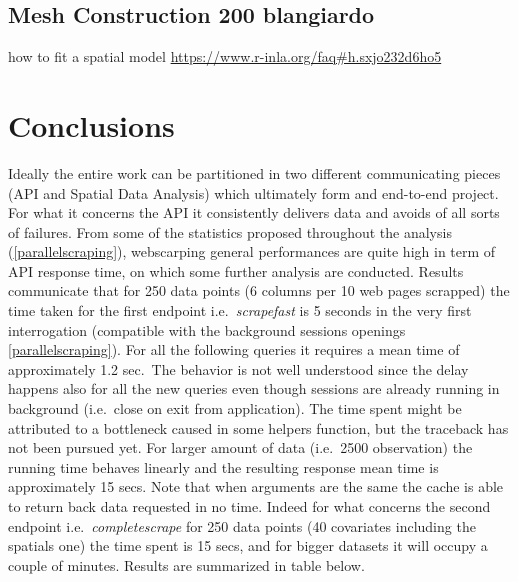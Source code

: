 \documentclass[
  12pt,
  a4paper,
  oneside]{book}
\theoremstyle{definition}
\theoremstyle{definition}
\theoremstyle{definition}
\theoremstyle{remark}
\begin{document}
\hypertarget{mesh-construction-200-blangiardo}{%
\section{Mesh Construction 200 blangiardo}\label{mesh-construction-200-blangiardo}}

how to fit a spatial model
\url{https://www.r-inla.org/faq\#h.sxjo232d6ho5}

\hypertarget{conclusions}{%
\chapter{Conclusions}\label{conclusions}}

Ideally the entire work can be partitioned in two different communicating pieces (API and Spatial Data Analysis) which ultimately form and end-to-end project. For what it concerns the API it consistently delivers data and avoids of all sorts of failures. From some of the statistics proposed throughout the analysis (\ref{parallelscraping}), webscarping general performances are quite high in term of API response time, on which some further analysis are conducted. Results communicate that for 250 data points (6 columns per 10 web pages scrapped) the time taken for the first endpoint i.e.~\emph{scrapefast} is 5 seconds in the very first interrogation (compatible with the background sessions openings \ref{parallelscraping}). For all the following queries it requires a mean time of approximately 1.2 sec.~The behavior is not well understood since the delay happens also for all the new queries even though sessions are already running in background (i.e.~close on exit from application). The time spent might be attributed to a bottleneck caused in some helpers function, but the traceback has not been pursued yet. For larger amount of data (i.e.~2500 observation) the running time behaves linearly and the resulting response mean time is approximately 15 secs. Note that when arguments are the same the cache is able to return back data requested in no time.
Indeed for what concerns the second endpoint i.e.~\emph{completescrape} for 250 data points (40 covariates including the spatials one) the time spent is 15 secs, and for bigger datasets it will occupy a couple of minutes. Results are summarized in table below.
\end{document}
